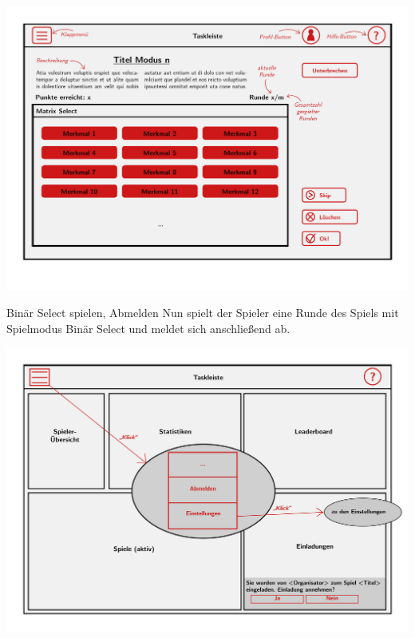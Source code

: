 \documentclass[xcolor=dvipsnames]{beamer}
\begin{document}
	\begin{frame}
	\includegraphics[width=\textwidth]{../../pictures/MatrixSelect.jpg}
	\end{frame}
	\begin{frame}
		\begin{block}{Binär Select spielen, Abmelden}
		Nun spielt der Spieler eine Runde des Spiels mit Spielmodus Binär Select und meldet sich anschließend ab.
		\end{block}
		\includegraphics[width=\textwidth]{../../pictures/5_Spieler.jpg}
	\end{frame}
\end{document}
